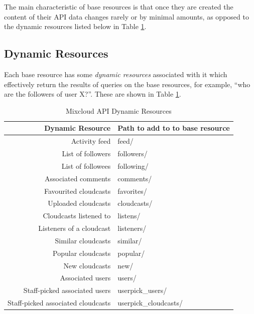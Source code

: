 \documentclass[a4paper,12pt,twoside,notitlepage]{report}
\newcommand{\todo}[1]{\ifdraft{\textsf{\color{red} TODO: #1}}\fi}
\begin{document}
The main characteristic of base resources is that once they are created the
content of their API data changes rarely or by minimal amounts, as opposed to
the dynamic resources listed below in Table \ref{tab:dyn-resources}.



\subsection{Dynamic Resources}
Each base resource has some \emph{dynamic resources} associated with
it which effectively return the results of queries on the base resources, for
example, ``who are the followers of user X?''. These are shown in Table
\ref{tab:dyn-resources}.

\begin{table}[h]
  \begin{center}
  \begin{tabular}{r >{\ttfamily}l<{\normalfont}}
Dynamic Resource 	& \textnormal{Path to add to to base resource} \\
\hline
Activity feed 	& feed/ \\
List of followers & followers/ \\
List of followees & following/ \\
Associated comments & comments/ \\
Favourited cloudcasts & favorites/ \\
Uploaded cloudcasts & cloudcasts/ \\
Cloudcasts listened to & listens/ \\
Listeners of a cloudcast & listeners/ \\
Similar cloudcasts & similar/ \\
Popular cloudcasts & popular/ \\
New cloudcasts & new/ \\
Associated users & users/ \\
Staff-picked associated users & userpick\_users/ \\
Staff-picked associated cloudcasts & userpick\_cloudcasts/ \\
  \end{tabular}
   
  \end{center}
\caption{Mixcloud API Dynamic Resources}
\label{tab:dyn-resources}
\end{table}
\end{document}
